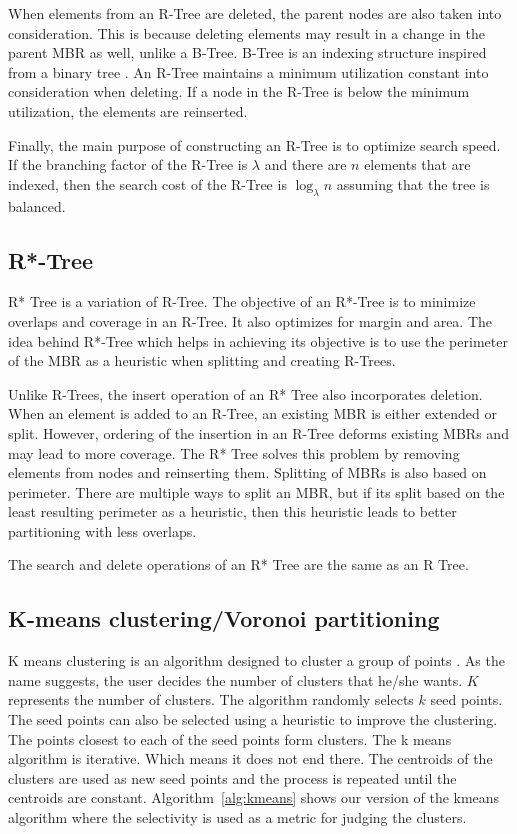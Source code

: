 When elements from an R-Tree are deleted, the parent nodes are also taken into consideration. This is because deleting elements may result in a change in the parent MBR as well, unlike a B-Tree. B-Tree is an indexing structure inspired from a binary tree \citep{bayer1970organization}. An R-Tree maintains a minimum utilization constant into consideration when deleting. If a node in the R-Tree is below the minimum utilization, the elements are reinserted.

Finally, the main purpose of constructing an R-Tree is to optimize search speed. If the branching factor of the R-Tree is $\lambda$ and there are $n$ elements that are indexed, then the search cost of the R-Tree is $\log_{\lambda}{n}$ assuming that the tree is balanced.


\subsection{R*-Tree}
R* Tree is a variation of R-Tree\citep{beckmann1990r}. The objective of an R*-Tree is to minimize overlaps and coverage in an R-Tree. It also optimizes for margin and area. The idea behind R*-Tree which helps in achieving its objective is to use the perimeter of the MBR as a heuristic when splitting and creating R-Trees.

Unlike R-Trees, the insert operation of an R* Tree also incorporates deletion. When an element is added to an R-Tree, an existing MBR is either extended or split. However, ordering of the insertion in an R-Tree deforms existing MBRs and may lead to more coverage. The R* Tree solves this problem by removing elements from nodes and reinserting them. Splitting of MBRs is also based on perimeter. There are multiple ways to split an MBR, but if its split based on the least resulting perimeter as a heuristic, then this heuristic leads to better partitioning with less overlaps.

The search and delete operations of an R* Tree are the same as an R Tree.

\subsection{K-means clustering/Voronoi partitioning}
K means clustering is an algorithm designed to cluster a group of points \citep{macqueen1967some}. As the name suggests, the user decides the number of clusters that he/she wants. $K$ represents the number of clusters. The algorithm randomly selects $k$ seed points. The seed points can also be selected using a heuristic to improve the clustering. The points closest to each of the seed points form clusters. The k means algorithm is iterative. Which means it does not end there. The centroids of the clusters are used as new seed points and the process is repeated until the centroids are constant. Algorithm~\ref{alg:kmeans} shows our version of the kmeans algorithm where the selectivity is used as a metric for judging the clusters.

